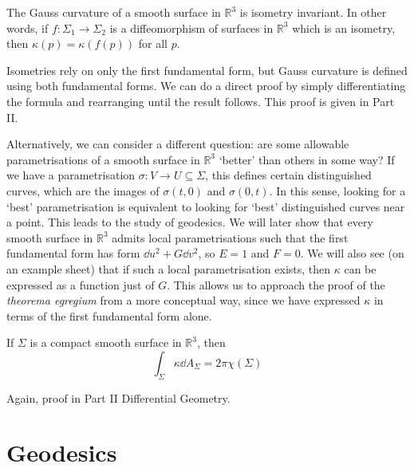 \documentclass[a4paper]{article}
\begin{document}
\begin{theorem}
	The Gauss curvature of a smooth surface in \( \mathbb R^3 \) is isometry invariant.
	In other words, if \( f \colon \Sigma_1 \to \Sigma_2 \) is a diffeomorphism of surfaces in \( \mathbb R^3 \) which is an isometry, then \( \kappa(p) = \kappa(f(p)) \) for all \( p \).
\end{theorem}
\begin{remark}
	Isometries rely on only the first fundamental form, but Gauss curvature is defined using both fundamental forms.
	We can do a direct proof by simply differentiating the formula and rearranging until the result follows.
	This proof is given in Part II.

	Alternatively, we can consider a different question: are some allowable parametrisations of a smooth surface in \( \mathbb R^3 \) `better' than others in some way?
	If we have a parametrisation \( \sigma \colon V \to U \subseteq \Sigma \), this defines certain distinguished curves, which are the images of \( \sigma(t,0) \) and \( \sigma(0,t) \).
	In this sense, looking for a `best' parametrisation is equivalent to looking for `best' distinguished curves near a point.
	This leads to the study of geodesics.
	We will later show that every smooth surface in \( \mathbb R^3 \) admits local parametrisations such that the first fundamental form has form \( \dd{u}^2 + G \dd{v}^2 \), so \( E = 1 \) and \( F = 0 \).
	We will also see (on an example sheet) that if such a local parametrisation exists, then \( \kappa \) can be expressed as a function just of \( G \).
	This allows us to approach the proof of the \textit{theorema egregium} from a more conceptual way, since we have expressed \( \kappa \) in terms of the first fundamental form alone.
\end{remark}
\begin{theorem}
	If \( \Sigma \) is a compact smooth surface in \( \mathbb R^3 \), then
	\[
		\int_\Sigma \kappa \dd{A_\Sigma} = 2 \pi \chi(\Sigma)
	\]
\end{theorem}
Again, proof in Part II Differential Geometry.

\section{Geodesics}
\end{document}
